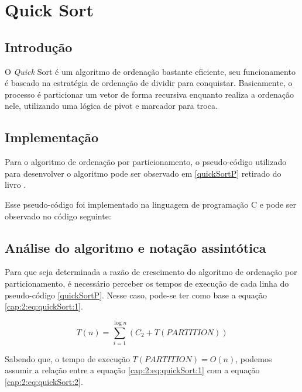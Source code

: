 \section{Quick Sort} \label{cap:2:section:qsort}

\subsection{Introdução}

O \textit{Quick} Sort é um algoritmo de ordenação bastante eficiente, seu funcionamento é baseado
na estratégia de ordenação de dividir para conquistar. Basicamente, o processo é particionar um vetor
de forma recursiva enquanto realiza a ordenação nele, utilizando uma lógica de pivot e marcador para
troca.

\subsection{Implementação}

Para o algoritmo de ordenação por particionamento, o pseudo-código utilizado para desenvolver o
algoritmo pode ser observado em \ref{quickSortP} retirado do livro \cite{cormen2022algorithms}.



Esse pseudo-código foi implementado na linguagem de programação C 
e pode ser observado no código seguinte:



\subsection{Análise do algoritmo e notação assintótica}

Para que seja determinada a razão de crescimento do algoritmo de ordenação por particionamento, é necessário
perceber os tempos de execução de cada linha do pseudo-código \ref{quickSortP}.
Nesse caso, pode-se ter como base a equação \ref{cap:2:eq:quickSort:1}.

\begin{equation} \label{cap:2:eq:quickSort:1}
    T(n) = \sum_{i=1}^{\log n}(C_2 + T(PARTITION))
\end{equation}

Sabendo que, o tempo de execução $T(PARTITION) = O(n)$, podemos assumir a relação entre a equação 
\ref{cap:2:eq:quickSort:1} com a equação \ref{cap:2:eq:quickSort:2}.

